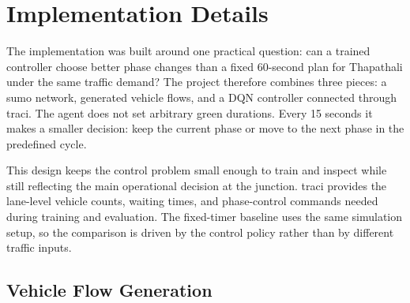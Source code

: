 \chapter{Implementation Details}
\label{chap:implementation_details}

The implementation was built around one practical question: can a trained controller choose better phase changes than a fixed 60-second plan for Thapathali under the same traffic demand? The project therefore combines three pieces: a \gls{sumo} network, generated vehicle flows, and a DQN controller connected through \gls{traci}. The agent does not set arbitrary green durations. Every 15 seconds it makes a smaller decision: keep the current phase or move to the next phase in the predefined cycle.

This design keeps the control problem small enough to train and inspect while still reflecting the main operational decision at the junction. \gls{traci} provides the lane-level vehicle counts, waiting times, and phase-control commands needed during training and evaluation. The fixed-timer baseline uses the same simulation setup, so the comparison is driven by the control policy rather than by different traffic inputs.

\section{Vehicle Flow Generation}
\label{sec:vehicle_flow_generation}

